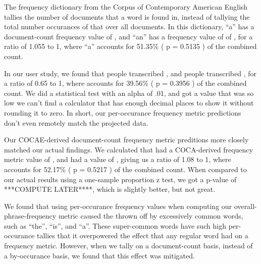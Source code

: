 The frequency dictionary from the Corpus of Contemporary American English\cite{freeFreqList} tallies the number of documents that a word is found in, instead of tallying the total number occurances of that over all documents.  In this dictionary, ``a'' has a document-count frequency value of \cocaDocCountForA, and ``an'' has a frequency value of of \cocaDocCountForAn, for a ratio of 1.055 to 1, where ``a'' accounts for 51.35\% ( p = 0.5135 ) of the combined count.  

In our user study, we found that \USATranscriptionsOfPhraseOne people transcribed \phraseOne, and \USATranscriptionsOfPhraseTwo people transcribed \phraseTwo, for a ratio of 0.65 to 1, where \phraseOne accounts for 39.56\% ( p = 0.3956 ) of the combined count. We did a statistical test with an alpha of .01, and got a value that was so low we can't find a calculator that has enough decimal places to show it without rounding it to zero. In short, our per-occurance frequency metric predictions don't even remotely match the projected data. 

Our COCAE-derived document-count frequency metric preditions more closely matched our actual findings.  We calculated that \phraseOne had a COCA-derived frequency metric value of \cocaFreqForPhraseOne, and \phraseTwo had a value of \cocaFreqForPhraseTwo, giving us a ratio of 1.08 to 1, where \phraseOne accounts for 52.17\% ( p = 0.5217 ) of the combined count. When compared to our actual results using a one-sample proportion z test, we got a p-value of ***COMPUTE LATER****, which is slightly better, but not great. 




We found that using per-occurance frequency values when computing our overall-phrase-frequency metric caused the thrown off by excessively common words, such as ``the'', ``is'', and ``a''. These super-common words have such high per-occurance tallies that it overpowered the effect that any regular word had on a frequency metric. However, when we tally on a document-count basis, instead of a by-occurance basis, we found that this effect was mitigated. 
